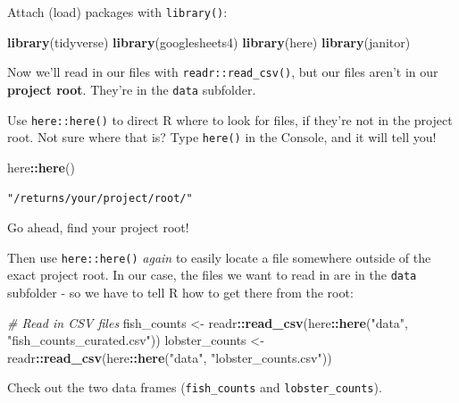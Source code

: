 \documentclass[]{book}
\newenvironment{Shaded}{\begin{snugshade}}{\end{snugshade}}
\newcommand{\CommentTok}[1]{\textcolor[rgb]{0.56,0.35,0.01}{\textit{#1}}}
\newcommand{\KeywordTok}[1]{\textcolor[rgb]{0.13,0.29,0.53}{\textbf{#1}}}
\newcommand{\NormalTok}[1]{#1}
\newcommand{\OperatorTok}[1]{\textcolor[rgb]{0.81,0.36,0.00}{\textbf{#1}}}
\newcommand{\StringTok}[1]{\textcolor[rgb]{0.31,0.60,0.02}{#1}}
\begin{document}
Attach (load) packages with \texttt{library()}:

\begin{Shaded}
\begin{Highlighting}[]
\KeywordTok{library}\NormalTok{(tidyverse)}
\KeywordTok{library}\NormalTok{(googlesheets4)}
\KeywordTok{library}\NormalTok{(here)  }
\KeywordTok{library}\NormalTok{(janitor) }
\end{Highlighting}
\end{Shaded}

Now we'll read in our files with \texttt{readr::read\_csv()}, but our files aren't in our \textbf{project root}. They're in the \texttt{data} subfolder.

Use \texttt{here::here()} to direct R where to look for files, if they're not in the project root. Not sure where that is? Type \texttt{here()} in the Console, and it will tell you!

\begin{Shaded}
\begin{Highlighting}[]
\NormalTok{here}\OperatorTok{::}\KeywordTok{here}\NormalTok{()}
\end{Highlighting}
\end{Shaded}

\texttt{"/returns/your/project/root/"}

Go ahead, find your project root!

Then use \texttt{here::here()} \emph{again} to easily locate a file somewhere outside of the exact project root. In our case, the files we want to read in are in the \texttt{data} subfolder - so we have to tell R how to get there from the root:

\begin{Shaded}
\begin{Highlighting}[]
\CommentTok{# Read in CSV files}
\NormalTok{fish_counts <-}\StringTok{ }\NormalTok{readr}\OperatorTok{::}\KeywordTok{read_csv}\NormalTok{(here}\OperatorTok{::}\KeywordTok{here}\NormalTok{(}\StringTok{"data"}\NormalTok{, }\StringTok{"fish_counts_curated.csv"}\NormalTok{))}
\NormalTok{lobster_counts <-}\StringTok{ }\NormalTok{readr}\OperatorTok{::}\KeywordTok{read_csv}\NormalTok{(here}\OperatorTok{::}\KeywordTok{here}\NormalTok{(}\StringTok{"data"}\NormalTok{, }\StringTok{"lobster_counts.csv"}\NormalTok{))}
\end{Highlighting}
\end{Shaded}

Check out the two data frames (\texttt{fish\_counts} and \texttt{lobster\_counts}).
\end{document}
